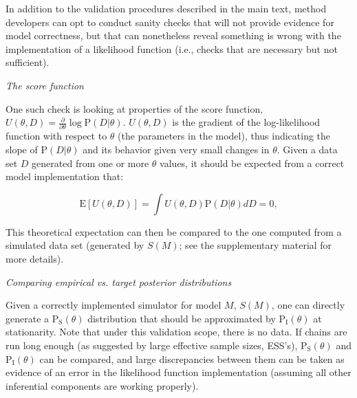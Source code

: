 \documentclass[oneside]{article}
\begin{document}
\vspace{.25cm}
\begin{tcolorbox}[breakable, width=\textwidth, colback=gray!10, boxrule=0pt,
  title=Box 2: Additional validation sanity-checks, fonttitle=\bfseries]
  \small

  In addition to the validation procedures described in the main text,
  method developers can opt to conduct sanity checks that will not
  provide evidence for model correctness, but that can nonetheless
  reveal something is wrong with the implementation of a likelihood
  function (i.e., checks that are necessary but not sufficient).
  
  \vspace{.25cm}
  \emph{The score function}
  
  One such check is looking at properties of the score function,
  $U(\theta,D)=\frac{\partial}{\partial\theta}\log
  \text{P}(D|\theta)$.
  $U(\theta,D)$ is the gradient of the log-likelihood function with
  respect to $\theta$ (the parameters in the model), thus indicating
  the slope of $\text{P}(D|\theta)$ and its behavior given very small
  changes in $\theta$.
  Given a data set $D$ generated from one or more $\theta$ values, it
  should be expected from a correct model implementation that:

  \begin{equation}\label{eq:scorefunction}
    \text{E}[U(\theta,D)] = \int U(\theta,D)\text{P}(D|\theta)dD = 0,
  \end{equation}


  This theoretical expectation can then be compared to the one
  computed from a simulated data set (generated by $S(M)$; see the
  supplementary material for more details).

  \vspace{.25cm}
  \emph{Comparing empirical vs. target posterior distributions}

  Given a correctly implemented simulator for model $M$, $S(M)$, one
  can directly generate a $\text{P}_{\text{S}}(\theta)$ distribution that
  should be approximated by $\text{P}_{\text{I}}(\theta)$ at stationarity.
  Note that under this validation scope, there is no data.
  If chains are run long enough (as suggested by large effective
  sample sizes, ESS's), $\text{P}_{\text{S}}(\theta)$ and
  $\text{P}_{\text{I}}(\theta)$ can be compared, and large
  discrepancies between them can be taken as evidence of an error in the
  likelihood function implementation (assuming all other inferential
  components are working properly).


\end{tcolorbox}
\end{document}
